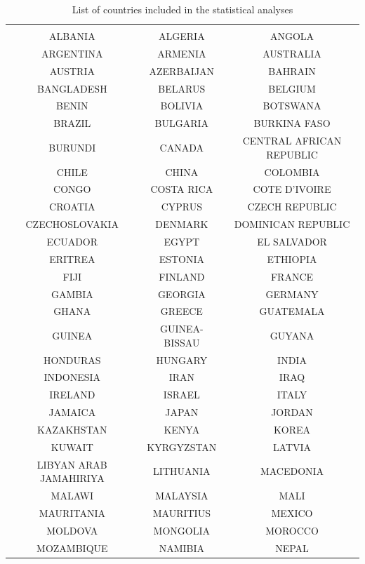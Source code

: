 \documentclass[12pt,a4paper]{article}\usepackage[]{graphicx}\usepackage[]{color}
\begin{document}
\begin{table}[!htbp] \centering 
  \caption{List of countries included in the statistical analyses} 
  \label{} 
\scriptsize 
\begin{tabular}{@{\extracolsep{5pt}} ccc} 
\\[-1.8ex]\hline 
\hline \\[-1.8ex] 
ALBANIA & ALGERIA & ANGOLA \\ 
ARGENTINA & ARMENIA & AUSTRALIA \\ 
AUSTRIA & AZERBAIJAN & BAHRAIN \\ 
BANGLADESH & BELARUS & BELGIUM \\ 
BENIN & BOLIVIA & BOTSWANA \\ 
BRAZIL & BULGARIA & BURKINA FASO \\ 
BURUNDI & CANADA & CENTRAL AFRICAN REPUBLIC \\ 
CHILE & CHINA & COLOMBIA \\ 
CONGO & COSTA RICA & COTE D'IVOIRE \\ 
CROATIA & CYPRUS & CZECH REPUBLIC \\ 
CZECHOSLOVAKIA & DENMARK & DOMINICAN REPUBLIC \\ 
ECUADOR & EGYPT & EL SALVADOR \\ 
ERITREA & ESTONIA & ETHIOPIA \\ 
FIJI & FINLAND & FRANCE \\ 
GAMBIA & GEORGIA & GERMANY \\ 
GHANA & GREECE & GUATEMALA \\ 
GUINEA & GUINEA-BISSAU & GUYANA \\ 
HONDURAS & HUNGARY & INDIA \\ 
INDONESIA & IRAN & IRAQ \\ 
IRELAND & ISRAEL & ITALY \\ 
JAMAICA & JAPAN & JORDAN \\ 
KAZAKHSTAN & KENYA & KOREA \\ 
KUWAIT & KYRGYZSTAN & LATVIA \\ 
LIBYAN ARAB JAMAHIRIYA & LITHUANIA & MACEDONIA \\ 
MALAWI & MALAYSIA & MALI \\ 
MAURITANIA & MAURITIUS & MEXICO \\ 
MOLDOVA & MONGOLIA & MOROCCO \\ 
MOZAMBIQUE & NAMIBIA & NEPAL \\ 

\end{tabular}
\end{table}
\end{document}
